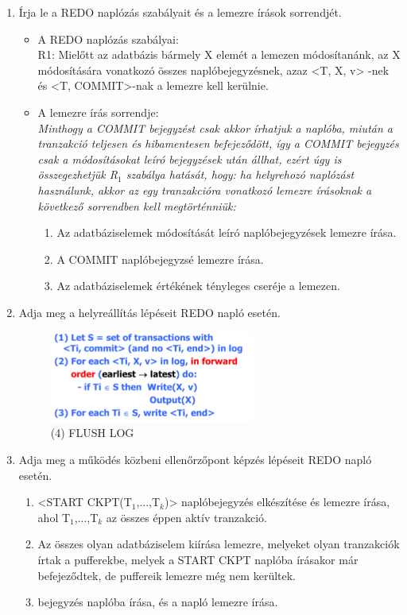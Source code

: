 \documentclass[a4paper,11.5pt, table]{article}
\begin{document}
\begin{enumerate}
\begin{itemize}
		\end{itemize}
	\item Írja le a REDO naplózás szabályait és a lemezre írások sorrendjét.
		\begin{itemize}
			\item A REDO naplózás szabályai:\\
			R1: Mielőtt az adatbázis bármely X elemét a lemezen módosítanánk, az X módosítására vonatkozó összes 
			naplóbejegyzésnek, azaz <T, X, v> -nek és <T, COMMIT>-nak a lemezre kell kerülnie.
			
			\item A lemezre írás sorrendje:\\
			\textit{Minthogy a COMMIT bejegyzést csak akkor írhatjuk a naplóba, miután a tranzakció teljesen és hibamentesen befejeződött, így a COMMIT bejegyzés csak a módosításokat leíró bejegyzések után állhat, ezért úgy is összegezhetjük R$_{1}$ szabálya hatását, hogy: ha helyrehozó naplózást használunk, akkor az egy tranzakcióra vonatkozó lemezre írásoknak a következő sorrendben kell megtörténniük:}
			\begin{enumerate}
				\item Az adatbáziselemek módosítását leíró naplóbejegyzések lemezre írása.
				\item A COMMIT naplóbejegyzsé lemezre írása.
				\item Az adatbáziselemek értékének tényleges cseréje a lemezen.
			\end{enumerate}
			
		\end{itemize}
	
	\item Adja meg a helyreállítás lépéseit REDO napló esetén.
		\begin{figure}[h]
			\centering
			\includegraphics[height = 3cm]{redo.png}\\
			(4) FLUSH LOG
		\end{figure}

	\item Adja meg a működés közbeni ellenőrzőpont képzés lépéseit REDO napló esetén.
		\begin{enumerate}
			\item <START CKPT(T$_{1}$,...,T$_{k}$)> naplóbejegyzés elkészítése és lemezre írása, ahol T$_{1}$,...,T$_{k}$ az összes éppen aktív tranzakció.
			\item Az összes olyan adatbáziselem kiírása lemezre, melyeket olyan tranzakciók írtak a pufferekbe, melyek a START CKPT naplóba írásakor már befejeződtek, de puffereik lemezre még nem kerültek.
			\item <END CKPT> bejegyzés naplóba írása, és a napló lemezre írása.
		\end{enumerate}	
		

\end{enumerate}
\end{document}
